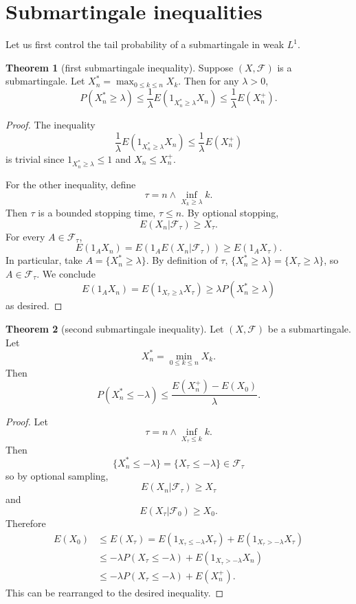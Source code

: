 \documentclass[12pt]{book}
\theoremstyle{definition}
\newtheorem{theorem}{Theorem}[chapter]
\begin{document}
\section{Submartingale inequalities}
Let us first control the tail probability of a submartingale in weak $L^1$.

\begin{theorem}[first submartingale inequality]
Suppose $(X, \mathcal F)$ is a submartingale.
Let $X_n^* = \max_{0 \leq k \leq n} X_k$. Then for any $\lambda > 0$,
$$P(X_n^* \geq \lambda) \leq \frac{1}{\lambda} E(1_{X_n^* \geq \lambda} X_n) \leq \frac{1}{\lambda} E(X_n^+).$$
\end{theorem}
\begin{proof}
The inequality
$$\frac{1}{\lambda} E(1_{X_n^* \geq \lambda} X_n) \leq \frac{1}{\lambda} E(X_n^+)$$
is trivial since $1_{X_n^* \geq \lambda} \leq 1$ and $X_n \leq X_n^+$.

For the other inequality, define
$$\tau = n \wedge \inf_{X_k \geq \lambda} k.$$
Then $\tau$ is a bounded stopping time, $\tau \leq n$.
By optional stopping,
$$E(X_n|\mathcal F_\tau) \geq X_\tau.$$
For every $A \in \mathcal F_\tau$,
$$E(1_A X_n) = E(1_A E(X_n|\mathcal F_\tau)) \geq E(1_A X_\tau).$$
In particular, take $A = \{X_n^* \geq \lambda\}$.
By definition of $\tau$, $\{X_n^* \geq \lambda\} = \{X_\tau \geq \lambda\}$, so $A \in \mathcal F_\tau$.
We conclude
$$E(1_A X_n) = E(1_{X_\tau \geq \lambda} X_\tau) \geq \lambda P(X_n^* \geq \lambda)$$
as desired.
\end{proof}

\begin{theorem}[second submartingale inequality]
Let $(X, \mathcal F)$ be a submartingale.
Let
$$X_n^* = \min_{0 \leq k \leq n} X_k.$$
Then
$$P(X_n^* \leq -\lambda) \leq \frac{E(X_n^+) - E(X_0)}{\lambda}.$$
\end{theorem}
\begin{proof}
Let
$$\tau = n \wedge \inf_{X_\tau \leq k} k.$$
Then
$$\{X_n^* \leq -\lambda\} = \{X_\tau \leq -\lambda\} \in \mathcal F_\tau$$
so by optional sampling,
$$E(X_n|\mathcal F_\tau) \geq X_\tau$$
and
$$E(X_\tau|\mathcal F_0) \geq X_0.$$
Therefore
\begin{align*}
E(X_0) &\leq E(X_\tau) = E(1_{X_\tau \leq -\lambda} X_\tau) + E(1_{X_\tau > -\lambda} X_\tau)\\
&\leq -\lambda P(X_\tau \leq -\lambda) + E(1_{X_\tau > -\lambda} X_n)\\
&\leq -\lambda P(X_\tau \leq -\lambda) + E(X_n^+).
\end{align*}
This can be rearranged to the desired inequality.
\end{proof}
\end{document}
